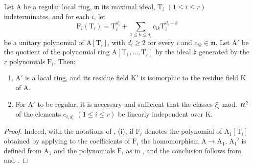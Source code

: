 \begin{corollary}[22.5.3]
\label{0.22.5.3}
Let $\mathrm{A}$ be a regular local ring, $\mathfrak{m}$ its maximal ideal, $\mathrm{T}_i$ $(1\leq i\leq r)$ indeterminates, and for each $i$, let
\[
\label{0.22.5.3.1}
  \mathrm{F}_i(\mathrm{T}_i)=\mathrm{T}_i^{d_i}+\sum_{1\leq k\leq d_i}c_{ik}\mathrm{T}_i^{d_i-k}
  \tag{22.5.3.1}
\]
be a unitary polynomial of $\mathrm{A}[\mathrm{T}_i]$, with $d_i\geq 2$ for every $i$ and $c_{ik}\in\mathfrak{m}$.
Let $\mathrm{A}'$ be the quotient of the polynomial ring $\mathrm{A}[\mathrm{T}_1,\ldots,\mathrm{T}_r]$ by the ideal $\mathfrak{b}$ generated by the $r$ polynomials $\mathrm{F}_i$.
Then:
\begin{enumerate}
  \item[\rm{(i)}] $\mathrm{A}'$ is a local ring, and its residue field $\mathrm{K}'$ is isomorphic to the residue field $\mathrm{K}$ of $\mathrm{A}$.
  \item[\rm{(ii)}] For $\mathrm{A}'$ to be regular, it is necessary and sufficient that the classes $\xi_i$ mod.~$\mathfrak{m}^2$ of the elements $c_{i,d_i}$ $(1\leq i\leq r)$ be linearly independent over $\mathrm{K}$.
\end{enumerate}
\end{corollary}

\begin{proof}
Indeed, with the notations of , (i), if $\overline{\mathrm{F}}_i$ denotes the polynomial of $\mathrm{A}_1[\mathrm{T}_i]$ obtained by applying to the coefficients of $\mathrm{F}_i$ the homomorphism $\mathrm{A}\to\mathrm{A}_1$, $\mathrm{A}_1'$ is defined from $\mathrm{A}_1$ and the polynomials $\overline{\mathrm{F}}_i$ as in , and the conclusion follows from  and .
\end{proof}

